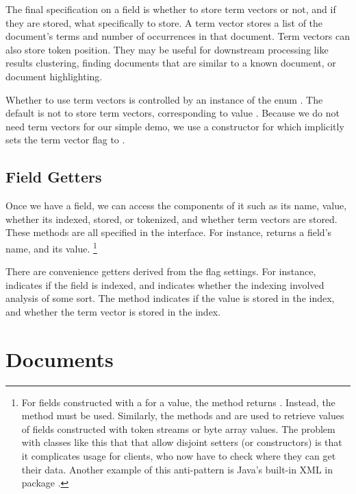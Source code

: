The final specification on a field is whether to store term vectors or
not, and if they are stored, what specifically to store.  A term
vector stores a list of the document's terms and number of occurrences
in that document.  Term vectors can also store token position.  They
may be useful for downstream processing like results clustering, 
finding documents that are similar to a known document, or document
highlighting.

Whether to use term vectors is controlled by an instance of the enum
.  The default is not to store term vectors,
corresponding to value .  Because we do not need
term vectors for our simple demo, we use a
constructor for  which implicitly sets the term vector
flag to .

\subsection{Field Getters}

Once we have a field, we can access the components of it such as its
name, value, whether its indexed, stored, or tokenized, and whether
term vectors are stored.  These methods are all specified in the
 interface.  For instance,  returns
a field's name, and  its value.%
%
\footnote{For fields constructed with a  for a value, the
  method  returns .  Instead, the
  method  must be used.  Similarly, the methods
   and  are used to
  retrieve values of fields constructed with token streams or byte
  array values.  The problem with classes like this that that allow
  disjoint setters (or constructors) is that it complicates usage for
  clients, who now have to check where they can get their data.
  Another example of this anti-pattern is Java's built-in XML
   in package .}
%

There are convenience getters derived from the flag settings.  For
instance,  indicates if the field is indexed, and
 indicates whether the indexing involved analysis
of some sort.  The method  indicates if the value is
stored in the index, and  whether the term
vector is stored in the index.

\section{Documents}

